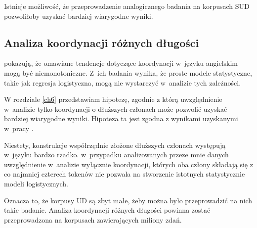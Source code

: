 Istnieje możliwość, że przeprowadzenie analogicznego badania na korpusach SUD pozwoliłoby uzyskać bardziej wiarygodne wyniki.

\subsection{Analiza koordynacji różnych długości}

\cite{przepiorkowski2024argument} pokazują, że omawiane tendencje dotyczące koordynacji w~języku angielskim mogą być niemonotoniczne. Z~ich badania wynika, że proste modele statystyczne, takie jak regresja logistyczna, mogą nie wystarczyć w~analizie tych zależności.

W rozdziale \ref{ch6} przedstawiam hipotezę, zgodnie z którą uwzględnienie w~analizie tylko koordynacji o dłuższych członach może pozwolić uzyskać bardziej wiarygodne wyniki. Hipoteza ta jest zgodna z wynikami uzyskanymi w~pracy \cite{przepiorkowski2024argument}. 

Niestety, konstrukcje współrzędnie złożone dłuższych członach występują w~języku bardzo rzadko. w~przypadku analizowanych przeze mnie danych uwzględnienie w~analizie wyłącznie koordynacji, których oba człony składają się z co najmniej czterech tokenów nie pozwala na stworzenie istotnych statystycznie modeli logistycznych.

Oznacza to, że korpusy UD są zbyt małe, żeby można było przeprowadzić na nich takie badanie. Analiza koordynacji różnych długości powinna zostać przeprowadzona na korpusach zawierających miliony zdań.
